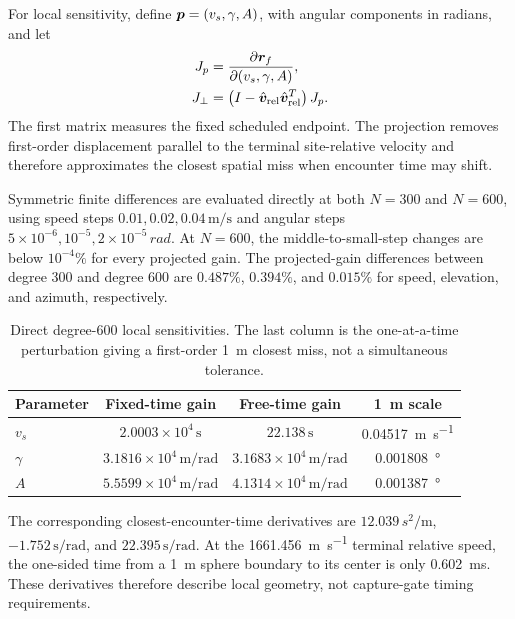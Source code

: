 For local sensitivity, define \(\bm{p}=(v_s,\gamma,A)\), with angular components in radians, and let
\begin{align}
 J_p&=\frac{\partial\bm{r}_f}{\partial(v_s,\gamma,A)},\\
 J_\perp&=\left(I-\hat{\bm{v}}_{\rm rel}\hat{\bm{v}}_{\rm rel}^{T}\right)J_p.
\label{eq:projected_jacobian_v2}
\end{align}
The first matrix measures the fixed scheduled endpoint. The projection removes first-order displacement parallel to the terminal site-relative velocity and therefore approximates the closest spatial miss when encounter time may shift.

Symmetric finite differences are evaluated directly at both \(N=300\) and \(N=600\), using speed steps \(0.01,0.02,0.04\,\si{\metre\per\second}\) and angular steps \(5\times10^{-6},10^{-5},2\times10^{-5}\,\si{rad}\). At \(N=600\), the middle-to-small-step changes are below \(10^{-4}\%\) for every projected gain. The projected-gain differences between degree 300 and degree 600 are \(0.487\%\), \(0.394\%\), and \(0.015\%\) for speed, elevation, and azimuth, respectively.

\begin{table}[tbp]
\caption{Direct degree-600 local sensitivities. The last column is the one-at-a-time perturbation giving a first-order \SI{1}{m} closest miss, not a simultaneous tolerance.}
\label{tab:sensitivity}
\footnotesize
\begin{ruledtabular}
\begin{tabular}{lccc}
Parameter & Fixed-time gain & Free-time gain & \SI{1}{m} scale \\
\hline
$v_s$ & $2.0003\times10^4\,\si{\second}$ & $22.138\,\si{\second}$ & \SI{0.04517}{\metre\per\second} \\
$\gamma$ & $3.1816\times10^4\,\si{\metre\per\radian}$ & $3.1683\times10^4\,\si{\metre\per\radian}$ & \SI{0.001808}{\degree} \\
$A$ & $5.5599\times10^4\,\si{\metre\per\radian}$ & $4.1314\times10^4\,\si{\metre\per\radian}$ & \SI{0.001387}{\degree}
\end{tabular}
\end{ruledtabular}
\end{table}

The corresponding closest-encounter-time derivatives are \(12.039\,\si{s^2\per\metre}\), \(-1.752\,\si{\second\per\radian}\), and \(22.395\,\si{\second\per\radian}\). At the \SI{1661.456}{\metre\per\second} terminal relative speed, the one-sided time from a \SI{1}{m} sphere boundary to its center is only \SI{0.602}{ms}. These derivatives therefore describe local geometry, not capture-gate timing requirements.


